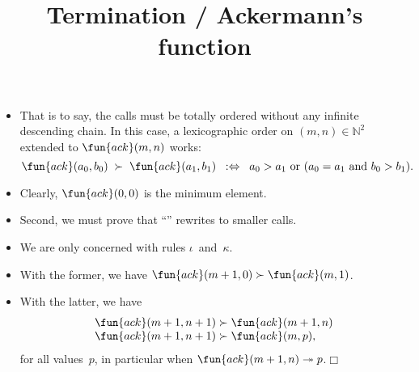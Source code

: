 \documentclass[wide]{slides}
\begin{document}
\begin{slide}
  \title{Termination / Ackermann's function}

  \begin{itemize}

    \item That is to say, the calls must be totally ordered without
      any infinite descending chain. In this case, a lexicographic
      order on \((m,n) \in \mathbb{N}^2\) extended to
      \(\fun{ack}(m,n)\) works:
      \begin{equation*}
        \fun{ack}(a_0,b_0) \; \succ \; \fun{ack}(a_1,b_1) \;\;
        :\Leftrightarrow \;\;
        \text{\(a_0 > a_1\) or (\(a_0 = a_1\) and \(b_0 > b_1\)).}
      \end{equation*}

    \item Clearly, \(\fun{ack}(0,0)\) is the minimum element.

    \item Second, we must prove that ``'' rewrites to smaller
      calls.

    \item We are only concerned with rules \(\iota\)~and~\(\kappa\).

    \item With the former, we have \(\fun{ack}(m+1,0) \succ
      \fun{ack}(m,1)\).

    \item With the latter, we have
      \begin{equation*}
        \begin{array}{@{}r@{\;}l@{\;}l@{}}
          \fun{ack}(m+1,n+1) & \succ & \fun{ack}(m+1,n)\\
          \fun{ack}(m+1,n+1) & \succ & \fun{ack}(m,p),
        \end{array}
      \end{equation*}
      for all values~\(p\), in particular when \(\fun{ack}(m+1,n)
      \twoheadrightarrow p\).\hfill\(\Box\)

  \end{itemize}

\end{slide}
\end{document}
